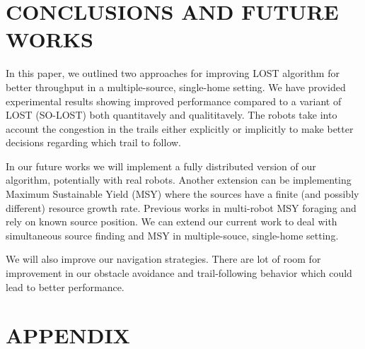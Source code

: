 \documentclass[letterpaper, 10 pt, conference]{ieeeconf}  %
\begin{document}
\section{CONCLUSIONS AND FUTURE WORKS}

In this paper, we outlined two approaches for improving LOST algorithm for better throughput in a multiple-source, single-home setting. We have provided experimental results showing improved performance compared to a variant of LOST (SO-LOST) both quantitavely and qualititavely.  The robots take into account the congestion in the trails either explicitly or implicitly to make better decisions regarding which trail to follow. 

In our future works we will implement a fully distributed version of our algorithm, potentially with real robots. Another extension can be implementing Maximum Sustainable Yield (MSY) \cite{MSY_PAPER Hjort et al. 1933 } where the sources have a finite (and possibly different) resource growth rate. Previous works in multi-robot MSY foraging \cite{Song and Vaughan 2013} and \cite{Zhang and Zhao Song 2016} rely on known source position. We can extend our current work to deal with simultaneous source finding and MSY in multiple-souce, single-home setting. 

We will also improve our navigation strategies. There are lot of room for improvement in our obstacle avoidance and trail-following behavior which could lead to better performance. 

\addtolength{\textheight}{-12cm}   %







\section*{APPENDIX}
\end{document}
